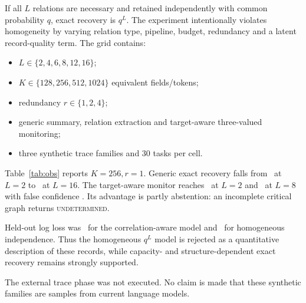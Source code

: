 \documentclass[10pt]{article}
\newcommand{\Und}{\textsc{undetermined}}
\begin{document}
If all $L$ relations are necessary and retained independently with common probability $q$, exact recovery is $q^L$. The experiment intentionally violates homogeneity by varying relation type, pipeline, budget, redundancy and a latent record-quality term. The grid contains:
\begin{itemize}
\item $L\in\{2,4,6,8,12,16\}$;
\item $K\in\{128,256,512,1024\}$ equivalent fields/tokens;
\item redundancy $r\in\{1,2,4\}$;
\item generic summary, relation extraction and target-aware three-valued monitoring;
\item three synthetic trace families and 30 tasks per cell.
\end{itemize}

Table~\ref{tab:obs} reports $K=256,r=1$. Generic exact recovery falls from \GenericLTwo\ at $L=2$ to \GenericLSixteen\ at $L=16$. The target-aware monitor reaches \MonitorLTwo\ at $L=2$ and \MonitorLEight\ at $L=8$ with false confidence \MonitorFalseConfidence. Its advantage is partly abstention: an incomplete critical graph returns \Und.

Held-out log loss was \RetentionBestLoss\ for the correlation-aware model and \RetentionIndLoss\ for homogeneous independence. Thus the homogeneous $q^L$ model is rejected as a quantitative description of these records, while capacity- and structure-dependent exact recovery remains strongly supported.

The external trace phase was not executed. No claim is made that these synthetic families are samples from current language models.
\end{document}
